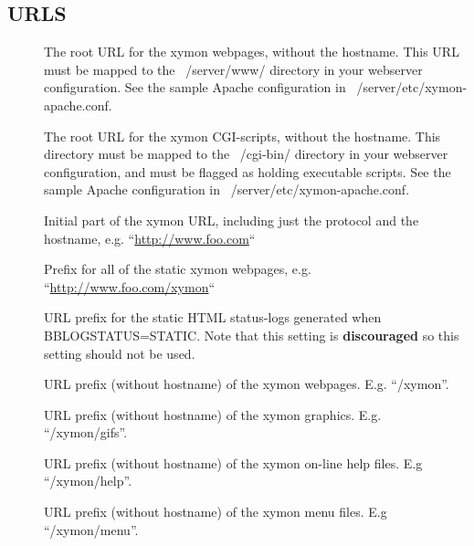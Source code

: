 \subsection{URLS}
\begin{description}
\item[] The root URL for the xymon webpages,
  without the hostname. This URL must be mapped to the ~/server/www/
  directory in your webserver configuration. See the sample Apache
  configuration in ~/server/etc/xymon-apache.conf. 


 

\item[] The root URL for the xymon CGI-scripts,
  without the hostname. This directory must be mapped to the
  ~/cgi-bin/ directory in your webserver configuration, and must be
  flagged as holding executable scripts. See the sample Apache
  configuration in ~/server/etc/xymon-apache.conf. 


 

\item[] Initial part of the xymon URL, including
  just the protocol and the hostname,
  e.g. ``\url{http://www.foo.com}`` 


 

\item[] Prefix for all of the static xymon
  webpages, e.g. ``\url{http://www.foo.com/xymon}`` 


 

\item[] URL prefix for the static HTML
  status-logs generated when BBLOGSTATUS=STATIC. Note that this
  setting is \textbf{discouraged} so this setting should not be used. 

 

\item[] URL prefix (without hostname) of the xymon webpages. E.g. ``/xymon''. 

 

\item[] URL prefix (without hostname) of the xymon graphics. E.g. ``/xymon/gifs''. 

 

\item[] URL prefix (without hostname) of the xymon on-line help files. E.g ``/xymon/help''. 

 

\item[] URL prefix (without hostname) of the xymon menu files. E.g ``/xymon/menu''. 


\end{description}
